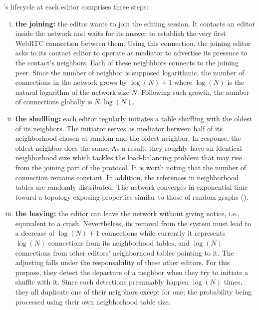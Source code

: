 \SPRAY's lifecycle at each editor comprises three steps:
\begin{enumerate}[(i)]
\item \textbf{the joining:} the editor wants to join the editing session. It
  contacts an editor inside the network and waits for its answer to establish
  the very first WebRTC connection between them. Using this connection, the
  joining editor asks to its contact editor to operate as mediator to advertise
  its presence to the contact's neighbors. Each of these neigbhbors connects to
  the joining peer. Since the number of neighbor is supposed logarithmic, the
  number of connections in the network grows by $\log(N)+1$ where $\log(N)$ is
  the natural logarithm of the network size $N$. Following such growth, the
  number of connections globally is $N.\log(N)$.
\item \textbf{the shuffling:} each editor regularly initiates a table shuffling
  with the oldest of its neigbhors. The initiator serves as mediator between
  half of its neighborhood chosen at random and the oldest neighbor. In
  response, the oldest neighbor does the same. As a result, they roughly have an
  identical neighborhood size which tackles the load-balancing problem that may
  rise from the joining part of the protocol. It is worth noting that the number
  of connection remains constant. In addition, the references in neighborhood
  tables are randomly distributed. The network converges in exponential time
  toward a topology exposing properties similar to those of random graphs
  (\REF).
\item \textbf{the leaving:} the editor can leave the network without giving
  notice, i.e., equivalent to a crash. Nevertheless, its removal from the system
  must lead to a decrease of $\log(N)+1$ connections while currently it
  represents $\log(N)$ connections from its neighborhood tables, and $\log(N)$
  connections from other editors' neighborhood tables pointing to it. The
  adjusting falls under the responsability of these other editors. For this
  purpose, they detect the departure of a neighbor when they try to initiate a
  shuffle with it. Since such detections presumably happen $\log(N)$ times, they
  all duplicate one of their neigbhors except for one; the probability being
  processed using their own neigbhorhood table size. 
\end{enumerate}

